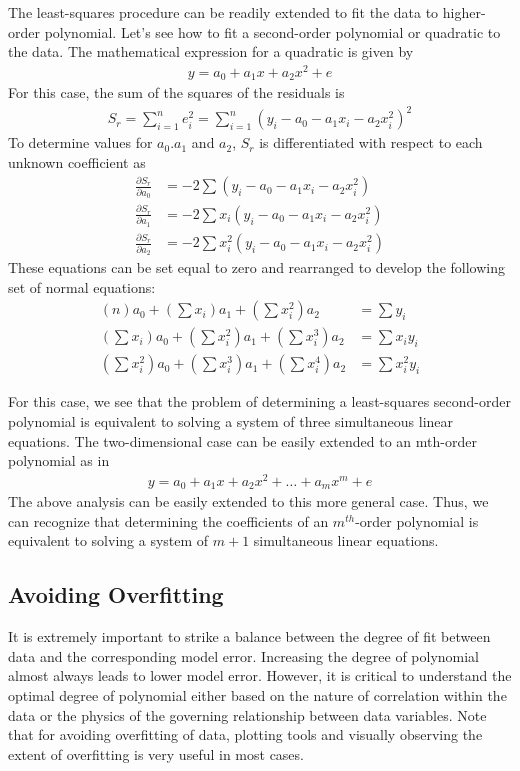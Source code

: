 \documentclass[book.tex]{subfiles}
\begin{document}
The least-squares procedure can be readily extended to fit the data to higher-order polynomial. Let's see how to fit a second-order polynomial or quadratic to the data. The mathematical expression for a quadratic is given by
\begin{align}
y = a_0 + a_1x + a_2x^2 + e
\end{align}
For this case, the sum of the squares of the residuals is
\begin{align}
S_r = \sum_{i=1}^{n}e_i^2 = \sum_{i=1}^{n}(y_i-a_0-a_1x_i-a_2x_i^2)^2
\end{align}
To determine values for $a_0$.$a_1$ and $a_2$, $S_r$ is differentiated with respect to each unknown coefficient as
\begin{align}
\frac{\partial S_r}{\partial a_0} &= -2\sum(y_i-a_0-a_1x_i-a_2x_i^2)\\
\frac{\partial S_r}{\partial a_1} &= -2\sum x_i(y_i-a_0-a_1x_i-a_2x_i^2)\\
\frac{\partial S_r}{\partial a_2} &= -2\sum x_i^2(y_i-a_0-a_1x_i-a_2x_i^2)
\end{align}
These equations can be set equal to zero and rearranged to develop the following set of
normal equations:
\begin{align}
(n)a_0 + (\sum x_i)a_1 + (\sum x_i^2)a_2&= \sum y_i\\
(\sum x_i)a_0 + (\sum x_i^2)a_1 + (\sum x_i^3)a_2 &=\sum x_iy_i\\
(\sum x_i^2)a_0 + (\sum x_i^3)a_1 + (\sum x_i^4)a_2 &=\sum x_i^2y_i
\end{align}

For this case, we see that the problem of determining a least-squares second-order
polynomial is equivalent to solving a system of three simultaneous linear equations. The
two-dimensional case can be easily extended to an mth-order polynomial as in
\begin{align}
y = a_0 + a_1x + a_2x^2 + \dots + a_mx^m + e
\end{align}
The above analysis can be easily extended to this more general case. Thus, we can
recognize that determining the coefficients of an $m^{th}$-order polynomial is equivalent to
solving a system of $m + 1$ simultaneous linear equations.

\subsection{Avoiding Overfitting}
It is extremely important to strike a balance between the degree of fit between data and the corresponding model error. Increasing the degree of polynomial almost always leads to lower model error. However, it is critical to understand the optimal degree of polynomial either based on the nature of correlation within the data or the physics of the governing relationship between data variables. Note that for avoiding overfitting of data, plotting tools and visually observing the extent of overfitting is very useful in most cases.
\end{document}
